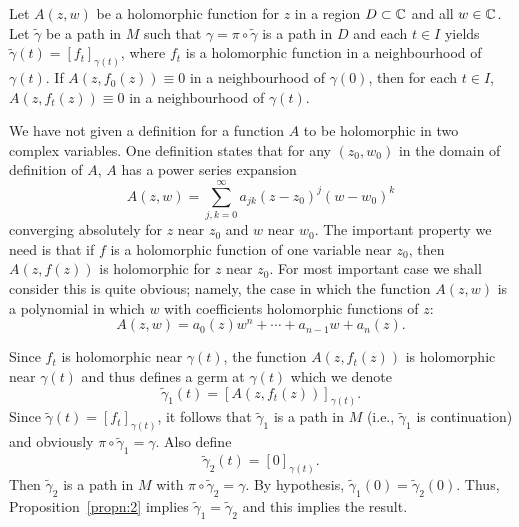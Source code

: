 \documentclass[a4paper,11pt]{article}
\begin{document}
\begin{thm}
  Let $A(z,w)$ be a holomorphic function for $z$ in a region $D
  \subset {\mathbb C}$ and all $w \in {\mathbb C}$.  Let $\widetilde{\gamma}$ be a
  path in $M$ such that $\gamma = \pi \circ \widetilde{\gamma}$ is a
  path in $D$ and each $t \in I$ yields $\widetilde{\gamma}(t) =
  [f_t]_{\gamma(t)}$, where $f_t$ is a holomorphic function in a
  neighbourhood of $\gamma(t)$.  If $A(z,f_0(z)) \equiv 0$ in a
  neighbourhood of $\gamma(0)$, then for each $t \in I$, $A(z,f_t(z))
  \equiv 0$ in a neighbourhood of $\gamma(t)$.
\end{thm}

\begin{rem}
  We have not given a definition for a function $A$ to be holomorphic
  in two complex variables.  One definition states that for any $(z_0,
  w_0)$ in the domain of definition of $A$, $A$ has a power series
  expansion
  $$
  A(z,w) = \sum_{j,k=0}^{\infty} a_{jk}(z-z_0)^j (w-w_0)^k
  $$
  converging absolutely for $z$ near $z_0$ and $w$ near $w_0$.  The
  important property we need is that if $f$ is a holomorphic function
  of one variable near $z_0$, then $A(z,f(z))$ is holomorphic for $z$
  near $z_0$.  For most important case we shall consider this is quite
  obvious; namely, the case in which the function $A(z,w)$ is a
  polynomial in which $w$ with coefficients holomorphic functions of
  $z$:
  $$
  A(z,w) = a_0(z) w^n + \cdots + a_{n-1}w + a_n(z).
  $$
\end{rem}

\begin{myproof}
  Since $f_t$ is holomorphic near $\gamma(t)$, the function
  $A(z,f_t(z))$ is holomorphic near $\gamma(t)$ and thus defines a
  germ at $\gamma(t)$ which we denote
  $$
  \widetilde{\gamma}_1(t) = [A(z,f_t(z))]_{\gamma(t)}.
  $$
  Since $\widetilde{\gamma}(t) = [f_t]_{\gamma(t)}$, it follows that
  $\widetilde{\gamma}_1$ is a path in $M$ (i.e., $\widetilde{\gamma}_1$
  is continuation) and obviously $\pi \circ \widetilde{\gamma}_1 =
  \gamma$.  Also define
  $$
  \widetilde{\gamma}_2(t) = [0]_{\gamma(t)}.
  $$
  Then $\widetilde{\gamma}_2$ is a path in $M$ with $\pi \circ
  \widetilde{\gamma}_2 = \gamma$.  By hypothesis,
  $\widetilde{\gamma}_1(0) = \widetilde{\gamma}_2(0)$.  Thus,
  Proposition~\ref{propn:2} implies $\widetilde{\gamma}_1 =
  \widetilde{\gamma}_2$ and this implies the result.
\end{myproof}
\end{document}
